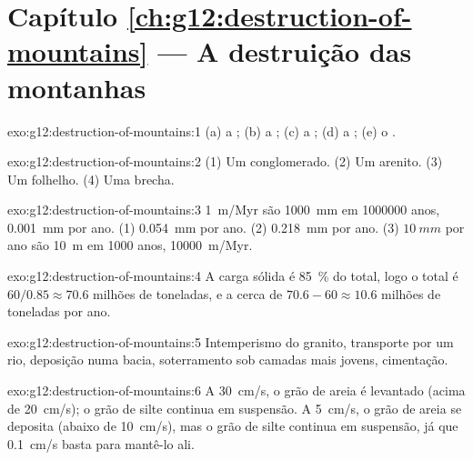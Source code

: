 \section*{Capítulo \ref{ch:g12:destruction-of-mountains} --- A destruição das montanhas}

\begin{solution}{exo:g12:destruction-of-mountains:1}
(a) a ; (b) a ; (c) a ;
(d) a ; (e) o .
\end{solution}

\begin{solution}{exo:g12:destruction-of-mountains:2}
(1) Um conglomerado. (2) Um arenito. (3) Um folhelho. (4) Uma brecha.
\end{solution}

\begin{solution}{exo:g12:destruction-of-mountains:3}
\qty{1}{m/Myr} são \qty{1000}{mm} em \num{1000000} anos, \qty{0.001}{mm}
por ano. (1) \qty{0.054}{mm} por ano. (2) \qty{0.218}{mm} por ano.
(3) $\qty{10}{mm}$ por ano são \qty{10}{m} em 1000 anos, \qty{10000}{m/Myr}.
\end{solution}

\begin{solution}{exo:g12:destruction-of-mountains:4}
A carga sólida é \qty{85}{\percent} do total, logo o total é $60/0.85
\approx 70.6$ milhões de toneladas, e a  cerca de $70.6 - 60 \approx
10.6$ milhões de toneladas por ano.
\end{solution}

\begin{solution}{exo:g12:destruction-of-mountains:5}
Intemperismo do granito, transporte por um rio, deposição numa bacia,
soterramento sob camadas mais jovens, cimentação.
\end{solution}

\begin{solution}{exo:g12:destruction-of-mountains:6}
A \qty{30}{cm/s}, o grão de areia é levantado (acima de \qty{20}{cm/s}); o
grão de silte continua em suspensão. A \qty{5}{cm/s}, o grão de areia se
deposita (abaixo de \qty{10}{cm/s}), mas o grão de silte continua em
suspensão, já que \qty{0.1}{cm/s} basta para mantê-lo ali.
\end{solution}

